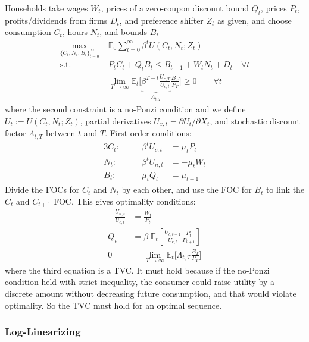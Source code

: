 \documentclass[12pt]{article}
\theoremstyle{plain}
\theoremstyle{definition}
\theoremstyle{remark}
\newcommand{\limT}{\lim_{T\rightarrow\infty}}
\newcommand{\E}{\mathbb{E}}
\newcommand{\sumtinfz}{\sum^\infty_{t=0}}
\newcommand{\tinfz}{^\infty_{t=0}}
\begin{document}
Households take wages $W_t$, prices of a zero-coupon discount bound
$Q_t$, prices $P_t$, profits/dividends from firms $D_t$, and preference
shifter $Z_t$ as given, and choose consumption $C_t$, hours $N_t$, and
bounds $B_t$
\begin{align*}
  \max_{\{C_t,N_t,B_t\}\tinfz} \;
  &\E_0\sumtinfz \beta^t U(C_t,N_t;Z_t) \\
  \text{s.t.}\quad&
  P_tC_t + Q_{t}B_t \leq B_{t-1} + W_tN_t + D_t\quad \forall t\\
  &\limT \E_t\bigg[
    \underbrace{\beta^{T-t} \frac{U_{c,T}}{U_{c,t}}}_{\Lambda_{t,T}}
    \frac{B_T}{P_T}
  \bigg]
  \geq 0
  \qquad \forall t
\end{align*}
where the second constraint is a no-Ponzi condition and
we define $U_t:=U(C_t,N_t;Z_t)$, partial derivatives
$U_{x,t}=\partial U_t/\partial X_t$, and stochastic discount factor
$\Lambda_{t,T}$ between $t$ and $T$.
First order conditions:
\begin{alignat*}{3}
  C_t:&&\quad
  \beta^t U_{c,t} &= \mu_t P_t
  \\
  N_t:&&\quad
  \beta^t U_{n,t} &= -\mu_t W_t
  \\
  B_t:&&\quad
  \mu_t Q_t &= \mu_{t+1}
\end{alignat*}
Divide the FOCs for $C_t$ and $N_t$ by each other, and use the FOC for
$B_t$ to link the $C_t$ and $C_{t+1}$ FOC. This gives optimality
conditions:
\begin{align*}
  -\frac{U_{n,t}}{U_{c,t}}
  &=
  \frac{W_t}{P_{t}} \\
  Q_t &=
  \beta\;
  \E_t\left[
    \frac{U_{c,t+1}}{U_{c,t}}
    \frac{P_t}{P_{t+1}}
  \right]
  \\
  0 &=
  \limT \E_t\bigg[
    \Lambda_{t,T}
    \frac{B_T}{P_T}
  \bigg]
\end{align*}
where the third equation is a TVC. It must hold because if the no-Ponzi
condition held with strict inequality, the consumer could raise
utility by a discrete amount without decreasing future consumption, and
that would violate optimality. So the TVC must hold for an optimal
sequence.




\clearpage
\subsubsection{Log-Linearizing}
\end{document}
